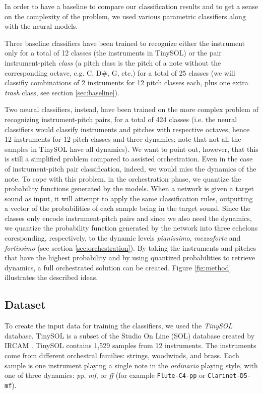 \documentclass{article}
\begin{document}
In order to have a baseline to compare our classification results and to get a sense on the complexity of the problem, we used various parametric classifiers along with the neural models.

Three baseline classifiers have been trained to recognize either the instrument only for a total of 12 classes (the instruments in TinySOL) or the pair instrument-pitch \emph{class} (a pitch class is the pitch of a note without the corresponding octave, e.g. C, D\#, G, etc.) for a total of 25 classes (we will classifiy combinations of 2 instruments for 12 pitch classes each, plus one extra \emph{trash} class, see section \ref{sec:baseline}).

Two neural classifiers, instead, have been trained on the more complex problem of recognizing instrument-pitch pairs, for a total of 424 classes (i.e. the neural classifiers would classify instruments and pitches with respective octaves, hence 12 instruments for 12 pitch classes and three dynamics; note that not all the samples in TinySOL have all dynamics). We want to point out, however, that this is still a simplified problem compared to assisted orchestration. Even in the case of instrument-pitch pair classification, indeed, we would miss the dynamics of the note. To cope with this problem, in the orchestration phase, we quantize the probability functions generated by the models. When a network is given a target sound as input, it will attempt to apply the same classification rules, outputting a vector of the probabilities of each sample being in the target sound. Since the classes only encode instrument-pitch pairs and since we also need the dynamics, we quantize the probability function generated by the network into three echelons coresponding, respectively, to the dynamic levels \emph{pianissimo}, \emph{mezzoforte} and \emph{fortissimo} (see section \ref{sec:orchestration}). By taking the instruments and pitches that have the highest probability and by using quantized probabilities to retrieve dynamics, a full orchestrated solution can be created.  Figure \ref{fig:method} illustrates the described ideas.

\subsection{Dataset}
\label{sec:dataset}

To create the input data for training the classifiers, we used the \emph{TinySOL} database. TinySOL is a subset of the Studio On Line (SOL) database created by IRCAM \cite{Cella2020b}. TinySOL contains 1,529 samples from 12 instruments. The instruments come from different orchestral families: strings, woodwinds, and brass. Each sample is one instrument playing a single note in the \emph{ordinario} playing style, with one of three dynamics: \textit{pp}, \textit{mf}, or \textit{ff} (for example \texttt{Flute-C4-pp} or \texttt{Clarinet-D5-mf}). 
\end{document}
